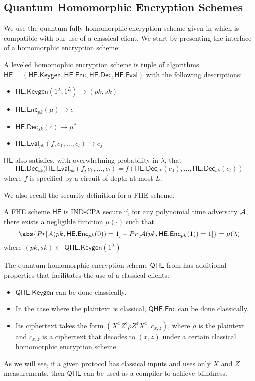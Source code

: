 \subsection{Quantum Homomorphic Encryption Schemes}

\def\QHE{\mathsf{QHE}}
\def\QGen{\mathsf{QHE.Keygen}}
\def\QEnc{\mathsf{QHE.Enc}}
\def\QEval{\mathsf{QHE.Eval}}
\def\QDec{\mathsf{QHE.Dec}}

We use the quantum fully homomorphic encryption scheme given in \cite{mahadev_qfhe} which is compatible with our use of a classical client. We start by presenting the interface of a homomorphic encryption scheme:
\begin{dfn}
	A leveled homomophic encryption scheme is tuple of algorithms $\mathsf{HE}=(\mathsf{HE.Keygen}, \mathsf{HE.Enc}, \mathsf{HE.Dec}, \mathsf{HE.Eval})$ with the following descriptions:
	\begin{itemize}
		\item $\mathsf{HE.Keygen}(1^\lambda, 1^L)\rightarrow(pk, sk)$
		\item $\mathsf{HE.Enc}_{pk}(\mu)\rightarrow c$
		\item $\mathsf{HE.Dec}_{sk}(c)\rightarrow \mu^*$
		\item $\mathsf{HE.Eval}_{pk}(f, c_1, \ldots, c_l)\rightarrow c_f$
	\end{itemize}
\end{dfn}

$\mathsf{HE}$ also satisfies, with overwhelming probability in $\lambda$, that
$$\mathsf{HE.Dec}_{sk}(\mathsf{HE.Eval}_{pk}(f, c_1, \ldots, c_l)=f(\mathsf{HE.Dec}_{sk}(c_0),\ldots,\mathsf{HE.Dec}_{sk}(c_l))$$
where $f$ is specified by a circuit of depth at most $L$.


We also recall the security definition for a FHE scheme.

\begin{dfn}
	A FHE scheme $\mathsf{HE}$ is IND-CPA secure if, for any polynomial time adversary $\mathcal{A}$, there exists a negligible function $\mu(\cdot)$ such that
	$$\abs{Pr[\cA(pk, \mathsf{HE.Enc}_{pk}(0))=1]-Pr[\cA(pk, \mathsf{HE.Enc}_{pk}(1))=1]}=\mu(\lambda)$$
	where $(pk, sk)\leftarrow\mathsf{QHE.Keygen}(1^\lambda)$
\end{dfn}

The quantum homomorphic encryption scheme $\mathsf{QHE}$ from \cite{mahadev_qfhe} has additional properties that facilitates the use of a classical clients:
\begin{itemize}
	\item $\QGen$ can be done classically.
	\item In the case where the plaintext is classical, $\QEnc$ can be done classically.
	\item Its ciphertext takes the form $(X^xZ^z\rho Z^zX^x, c_{x, z})$, where $\rho$ is the plaintext and $c_{x, z}$ is a ciphertext that decodes to $(x, z)$ under a certain classical homomorphic encryption scheme.
\end{itemize}

As we will see, if a given protocol has classical inputs and uses only $X$ and $Z$ measurements, then $\QHE$ can be used as a compiler to achieve blindness.
